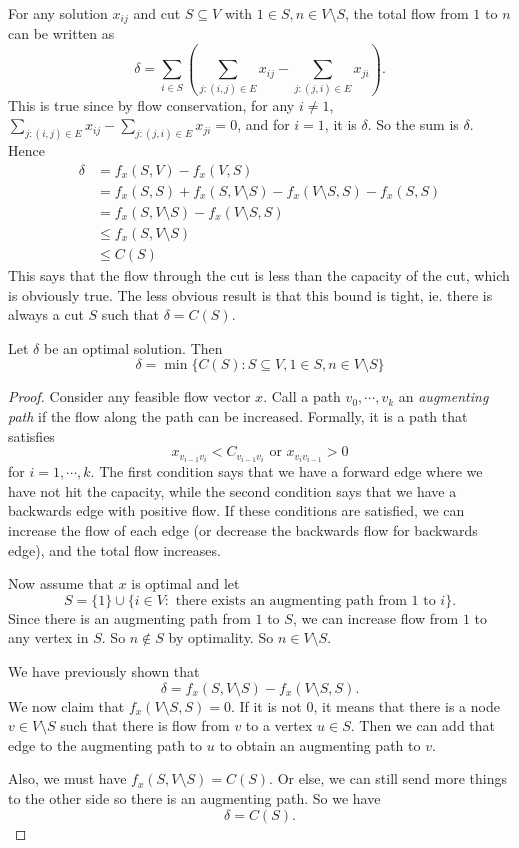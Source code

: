 \documentclass[a4paper]{article}
\begin{document}
For any solution $x_{ij}$ and cut $S\subseteq V$ with $1\in S, n\in V\setminus S$, the total flow from $1$ to $n$ can be written as
\[
  \delta = \sum_{i\in S}\left(\sum_{j: (i, j)\in E}x_{ij} - \sum_{j: (j, i)\in E}x_{ji}\right).
\]
This is true since by flow conservation, for any $i \not= 1$, $\sum\limits_{j: (i, j) \in E}x_{ij} - \sum\limits_{j: (j, i)\in E}x_{ji} = 0$, and for $i = 1$, it is $\delta$. So the sum is $\delta$. Hence
\begin{align*}
  \delta &= f_x(S, V) - f_x(V, S)\\
  &= f_x(S, S) + f_x(S, V\setminus S) - f_x(V\setminus S, S) - f_x(S, S)\\
  &= f_x(S, V\setminus S) - f_x(V\setminus S, S)\\
  &\leq f_x(S, V\setminus S)\\
  &\leq C(S)
\end{align*}
This says that the flow through the cut is less than the capacity of the cut, which is obviously true. The less obvious result is that this bound is tight, ie. there is always a cut $S$ such that $\delta = C(S)$.

\begin{thm}
  Let $\delta$ be an optimal solution. Then
  \[
    \delta = \min\{C(S): S\subseteq V, 1\in S, n \in V\setminus S\}
  \]
\end{thm}

\begin{proof}
  Consider any feasible flow vector $x$. Call a path $v_0, \cdots, v_k$ an \emph{augmenting path} if the flow along the path can be increased. Formally, it is a path that satisfies
  \[
    x_{v_{i - 1}v_i} < C_{v_{i - 1}v_i}\text{ or }x_{v_iv_{i - 1}} > 0
  \]
  for $i = 1,\cdots, k$. The first condition says that we have a forward edge where we have not hit the capacity, while the second condition says that we have a backwards edge with positive flow. If these conditions are satisfied, we can increase the flow of each edge (or decrease the backwards flow for backwards edge), and the total flow increases.

  Now assume that $x$ is optimal and let
  \[
    S = \{1\}\cup \{i\in V: \text{ there exists an augmenting path from $1$ to $i$}\}.
  \]
  Since there is an augmenting path from $1$ to $S$, we can increase flow from $1$ to any vertex in $S$. So $n \not\in S$ by optimality. So $n\in V\setminus S$.

  We have previously shown that
  \[
    \delta = f_x(S, V\setminus S) - f_x(V\setminus S, S).
  \]
  We now claim that $f_x(V\setminus S, S) = 0$. If it is not $0$, it means that there is a node $v\in V\setminus S$ such that there is flow from $v$ to a vertex $u\in S$. Then we can add that edge to the augmenting path to $u$ to obtain an augmenting path to $v$.

  Also, we must have $f_x(S, V\setminus S) = C(S)$. Or else, we can still send more things to the other side so there is an augmenting path. So we have
  \[
    \delta = C(S).
  \]
\end{proof}
\end{document}
